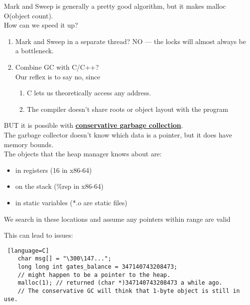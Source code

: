\documentclass[../../lecture_notes.tex]{subfiles}
\begin{document}
\noindent Mark and Sweep is generally a pretty good algorithm, but it makes malloc O(object count).\\
How can we speed it up?
\begin{enumerate} [itemsep=0mm]
	\item Mark and Sweep in a separate thread? NO — the locks will almost always be a bottleneck.
	\item Combine GC with C/C++? \\
		Our reflex is to say no, since
		\begin{enumerate} [itemsep=0mm] 
			\item C lets us theoretically access any address.
			\item The compiler doesn’t share roots or object layout with the program
		\end{enumerate}
\end{enumerate}

\noindent BUT it is possible with \textbf{\underline{conservative garbage collection}}.\\
\indent The garbage collector doesn’t know which data is a pointer, but it does have memory bounds.\\
\indent The objects that the heap manager knows about are:
	\begin{itemize} [itemsep=0mm]
		\item in registers (16 in x86-64)
		\item on the stack (\%rsp in x86-64)
		\item in static variables (*.o are static files)
	\end{itemize}
\indent We search in these locations and assume any pointers within range are valid

This can lead to issues:
	\begin{lstlisting} [language=C]
	char msg[] = "\300\147...";
	long long int gates_balance = 347140743208473;
	// might happen to be a pointer to the heap.
	malloc(1); // returned (char *)347140743208473 a while ago.  
	// The conservative GC will think that 1-byte object is still in use.
	\end{lstlisting}
\end{document}

